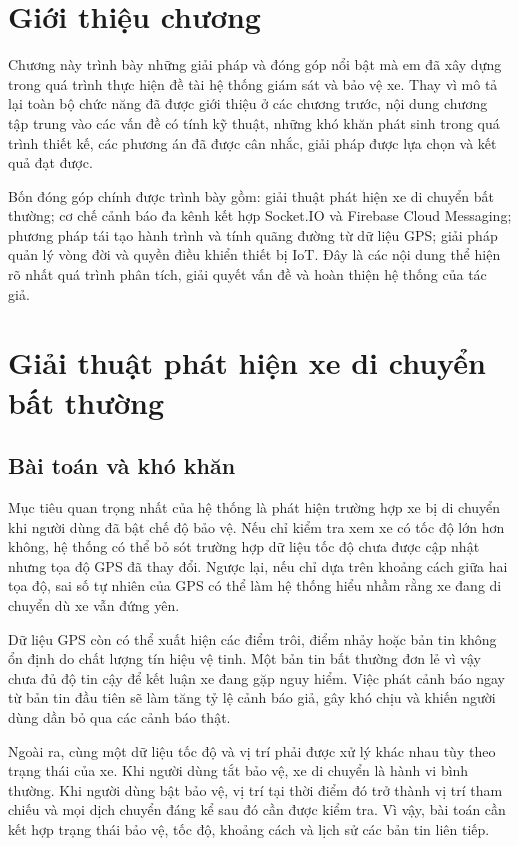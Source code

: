 \documentclass[../DoAn.tex]{subfiles}
\begin{document}
\section{Giới thiệu chương}

Chương này trình bày những giải pháp và đóng góp nổi bật mà em đã xây dựng trong
quá trình thực hiện đề tài hệ thống giám sát và bảo vệ xe. Thay vì mô tả lại
toàn bộ chức năng đã được giới thiệu ở các chương trước, nội dung chương tập
trung vào các vấn đề có tính kỹ thuật, những khó khăn phát sinh trong quá trình
thiết kế, các phương án đã được cân nhắc, giải pháp được lựa chọn và kết quả đạt
được.
  
Bốn đóng góp chính được trình bày gồm: giải thuật phát hiện xe di chuyển bất
thường; cơ chế cảnh báo đa kênh kết hợp Socket.IO và Firebase Cloud Messaging;
phương pháp tái tạo hành trình và tính quãng đường từ dữ liệu GPS; giải pháp
quản lý vòng đời và quyền điều khiển thiết bị IoT. Đây là các nội dung thể hiện
rõ nhất quá trình phân tích, giải quyết vấn đề và hoàn thiện hệ thống của tác
giả.


\section{Giải thuật phát hiện xe di chuyển bất thường}
\label{sec:phat-hien-bat-thuong}

\subsection{Bài toán và khó khăn}

Mục tiêu quan trọng nhất của hệ thống là phát hiện trường hợp xe bị di chuyển
khi người dùng đã bật chế độ bảo vệ. Nếu chỉ kiểm tra xem xe có tốc độ lớn hơn
không, hệ thống có thể bỏ sót trường hợp dữ liệu tốc độ chưa được cập nhật nhưng
tọa độ GPS đã thay đổi. Ngược lại, nếu chỉ dựa trên khoảng cách giữa hai tọa độ,
sai số tự nhiên của GPS có thể làm hệ thống hiểu nhầm rằng xe đang di chuyển dù
xe vẫn đứng yên.

Dữ liệu GPS còn có thể xuất hiện các điểm trôi, điểm nhảy hoặc bản tin không ổn
định do chất lượng tín hiệu vệ tinh. Một bản tin bất thường đơn lẻ vì vậy chưa
đủ độ tin cậy để kết luận xe đang gặp nguy hiểm. Việc phát cảnh báo ngay từ bản
tin đầu tiên sẽ làm tăng tỷ lệ cảnh báo giả, gây khó chịu và khiến người dùng
dần bỏ qua các cảnh báo thật.

Ngoài ra, cùng một dữ liệu tốc độ và vị trí phải được xử lý khác nhau tùy theo
trạng thái của xe. Khi người dùng tắt bảo vệ, xe di chuyển là hành vi bình
thường. Khi người dùng bật bảo vệ, vị trí tại thời điểm đó trở thành vị trí tham
chiếu và mọi dịch chuyển đáng kể sau đó cần được kiểm tra. Vì vậy, bài toán cần
kết hợp trạng thái bảo vệ, tốc độ, khoảng cách và lịch sử các bản tin liên tiếp.
\end{document}
